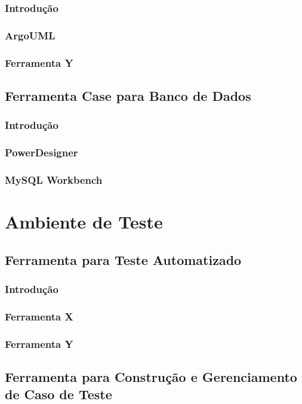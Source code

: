 \documentclass[12pt,a4paper]{article}
\begin{document}
		\subsubsection{Introdução}
		\subsubsection{ArgoUML}
		\subsubsection{Ferramenta Y}

	\subsection{Ferramenta Case para Banco de Dados}
		\subsubsection{Introdução}
		\subsubsection{PowerDesigner}
		\subsubsection{MySQL Workbench}
		
\clearpage
\section{Ambiente de Teste}
	\subsection{Ferramenta para Teste Automatizado}
		\subsubsection{Introdução}
		\subsubsection{Ferramenta X}
		\subsubsection{Ferramenta Y}
		
	\subsection{Ferramenta para Construção e Gerenciamento de Caso de Teste}
\end{document}
